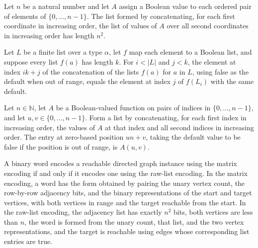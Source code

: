 \begin{lemma}
\label{Complexity.length_adjWord}
\leanok
{}
Let $n$ be a natural number and let $A$ assign a Boolean value to each ordered pair of
elements of $\{0,\ldots,n-1\}$. The list formed by concatenating, for each first
coordinate in increasing order, the list of values of $A$ over all second coordinates in
increasing order has length $n^2$.
\end{lemma}

\begin{lemma}
\label{Complexity.getD_flatMap_rows}
\leanok
{}
Let $L$ be a finite list over a type $\alpha$, let $f$ map each element to a Boolean
list, and suppose every list $f(a)$ has length $k$. For $i<|L|$ and $j<k$, the element
at index $ik+j$ of the concatenation of the lists $f(a)$ for $a$ in $L$, using false as
the default when out of range, equals the element at index $j$ of $f(L_i)$ with the same
default.
\end{lemma}

\begin{lemma}
\label{Complexity.adjWord_getD}
\leanok
{}
Let $n\in\mathbb{N}$, let $A$ be a Boolean-valued function on pairs of indices in
$\{0,\ldots,n-1\}$, and let $u,v\in\{0,\ldots,n-1\}$. Form a list by concatenating, for
each first index in increasing order, the values of $A$ at that index and all second
indices in increasing order. The entry at zero-based position $un+v$, taking the default
value to be false if the position is out of range, is $A(u,v)$.
\end{lemma}

\begin{theorem}
\label{Complexity.PATH_eq_pathRawLang}
\leanok
{}
A binary word encodes a reachable directed graph instance using the matrix encoding if
and only if it encodes one using the raw-list encoding. In the matrix encoding, a word
has the form obtained by pairing the unary vertex count, the row-by-row adjacency bits,
and the binary representations of the start and target vertices, with both vertices in
range and the target reachable from the start. In the raw-list encoding, the adjacency
list has exactly $n^2$ bits, both vertices are less than $n$, the word is formed from
the unary count, that list, and the two vertex representations, and the target is
reachable using edges whose corresponding list entries are true.
\end{theorem}

